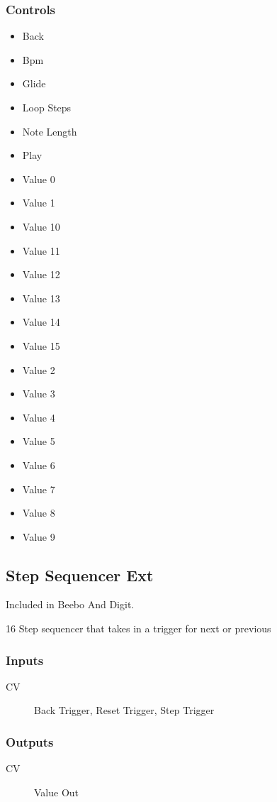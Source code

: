 \subsubsection{Controls}
\begin{itemize}
\item Back
\item Bpm
\item Glide
\item Loop Steps
\item Note Length
\item Play
\item Value 0
\item Value 1
\item Value 10
\item Value 11
\item Value 12
\item Value 13
\item Value 14
\item Value 15
\item Value 2
\item Value 3
\item Value 4
\item Value 5
\item Value 6
\item Value 7
\item Value 8
\item Value 9
\end{itemize}

\subsection{Step Sequencer Ext}

Included in Beebo And Digit.

16 Step sequencer that takes in a trigger for next or previous



\subsubsection{Inputs}
\begin{description}
\item [CV] Back Trigger, Reset Trigger, Step Trigger
\end{description}

\subsubsection{Outputs}
\begin{description}
\item [CV] Value Out
\end{description}

